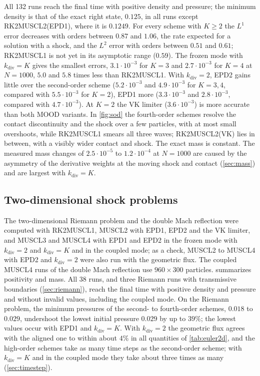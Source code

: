 \documentclass[smallextended]{svjour3}
\numberwithin{equation}{section}
\begin{document}
All 132 runs reach the final time with positive density and pressure; the minimum density is that of the exact right state, $0.125$, in all runs except RK2MUSCL2(EPD1), where it is $0.1249$. For every scheme with $K\ge2$ the $L^1$ error decreases with orders between $0.87$ and $1.06$, the rate expected for a solution with a shock, and the $L^2$ error with orders between $0.51$ and $0.61$; RK2MUSCL1 is not yet in its asymptotic range ($0.59$). The frozen mode with $k_{\mathrm{div}}=K$ gives the smallest errors, $3.1\cdot10^{-3}$ for $K=3$ and $2.7\cdot10^{-3}$ for $K=4$ at $N=1000$, $5.0$ and $5.8$ times less than RK2MUSCL1. With $k_{\mathrm{div}}=2$, EPD2 gains little over the second-order scheme ($5.2\cdot10^{-3}$ and $4.9\cdot10^{-3}$ for $K=3,4$, compared with $5.5\cdot10^{-3}$ for $K=2$), EPD1 more ($3.3\cdot10^{-3}$ and $2.8\cdot10^{-3}$, compared with $4.7\cdot10^{-3}$). At $K=2$ the VK limiter ($3.6\cdot10^{-3}$) is more accurate than both MOOD variants. In \cref{fig:sod} the fourth-order schemes resolve the contact discontinuity and the shock over a few particles, with at most small overshoots, while RK2MUSCL1 smears all three waves; RK2MUSCL2(VK) lies in between, with a visibly wider contact and shock. The exact mass is constant. The measured mass changes of $2.5\cdot10^{-5}$ to $1.2\cdot10^{-4}$ at $N=1000$ are caused by the asymmetry of the derivative weights at the moving shock and contact (\cref{sec:mass}) and are largest with $k_{\mathrm{div}}=K$.

\subsection{Two-dimensional shock problems}\label{sec:euler2d}

The two-dimensional Riemann problem and the double Mach reflection were computed with RK2MUSCL1, MUSCL2 with EPD1, EPD2 and the VK limiter, and MUSCL3 and MUSCL4 with EPD1 and EPD2 in the frozen mode with $k_{\mathrm{div}}=2$ and $k_{\mathrm{div}}=K$ and in the coupled mode; as a check, MUSCL2 to MUSCL4 with EPD2 and $k_{\mathrm{div}}=2$ were also run with the geometric flux. The coupled MUSCL4 runs of the double Mach reflection use $960\times300$ particles.  summarizes positivity and mass. All 38 runs, and three Riemann runs with transmissive boundaries (\cref{sec:riemann}), reach the final time with positive density and pressure and without invalid values, including the coupled mode. On the Riemann problem, the minimum pressures of the second- to fourth-order schemes, $0.018$ to $0.029$, undershoot the lowest initial pressure $0.029$ by up to $39\%$; the lowest values occur with EPD1 and $k_{\mathrm{div}}=K$. With $k_{\mathrm{div}}=2$ the geometric flux agrees with the aligned one to within about $4\%$ in all quantities of \cref{tab:euler2d}, and the high-order schemes take as many time steps as the second-order scheme; with $k_{\mathrm{div}}=K$ and in the coupled mode they take about three times as many (\cref{sec:timestep}).
\end{document}
